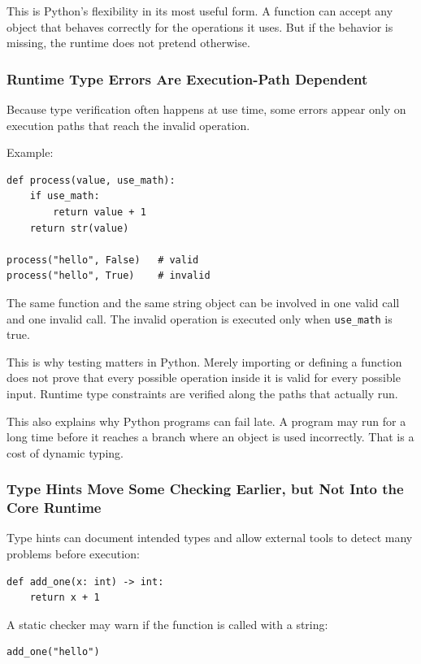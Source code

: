 This is Python's flexibility in its most useful form. A function can accept any object that behaves correctly for the operations it uses. But if the behavior is missing, the runtime does not pretend otherwise.

\subsubsection*{Runtime Type Errors Are Execution-Path Dependent}

Because type verification often happens at use time, some errors appear only on execution paths that reach the invalid operation.

Example:

\begin{verbatim}
def process(value, use_math):
    if use_math:
        return value + 1
    return str(value)

process("hello", False)   # valid
process("hello", True)    # invalid
\end{verbatim}

The same function and the same string object can be involved in one valid call and one invalid call. The invalid operation is executed only when \texttt{use\_math} is true.

This is why testing matters in Python. Merely importing or defining a function does not prove that every possible operation inside it is valid for every possible input. Runtime type constraints are verified along the paths that actually run.

This also explains why Python programs can fail late. A program may run for a long time before it reaches a branch where an object is used incorrectly. That is a cost of dynamic typing.

\subsubsection*{Type Hints Move Some Checking Earlier, but Not Into the Core Runtime}

Type hints can document intended types and allow external tools to detect many problems before execution:

\begin{verbatim}
def add_one(x: int) -> int:
    return x + 1
\end{verbatim}

A static checker may warn if the function is called with a string:

\begin{verbatim}
add_one("hello")
\end{verbatim}

